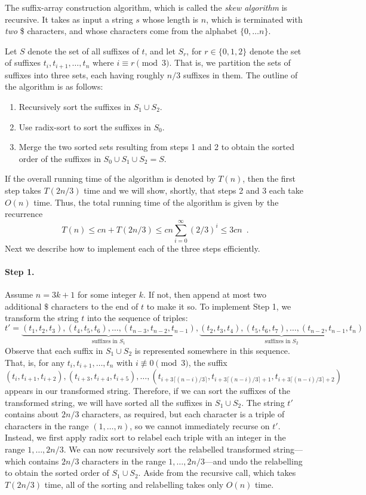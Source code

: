 The suffix-array construction algorithm, which is called the \emph{skew
algorithm} is recursive.  It takes as input a string $s$ whose length
is $n$, which is terminated with \emph{two} \$ characters, and whose
characters come from the alphabet $\{0,\ldots n\}$.

Let $S$ denote the set of all suffixes of $t$, and let $S_r$, for $r\in\{0,1,2\}$ denote the set of suffixes $t_i,t_{i+1},\ldots,t_n$ where $i\equiv r\pmod 3$.  That is, we partition the sets of suffixes into three sets, each having roughly $n/3$ suffixes in them.  The outline of the algorithm is as follows:

\begin{enumerate}
  \item Recursively sort the suffixes in $S_1\cup S_2$.
  \item Use radix-sort to sort the suffixes in $S_0$.
  \item Merge the two sorted sets resulting from steps 1 and 2 to obtain
     the sorted order of the suffixes in $S_0\cup S_1\cup S_2=S$.
\end{enumerate}
If the overall running time of the algorithm is denoted by $T(n)$, then the first step takes $T(2n/3)$ time and we will show, shortly, that steps 2 and 3 each take $O(n)$ time.  Thus, the total running time of the algorithm is given by the recurrence
\[
    T(n) \le cn + T(2n/3) \le cn\sum_{i=0}^\infty (2/3)^i \le 3cn \enspace .
\]
Next we describe how to implement each of the three steps efficiently.

\paragraph{Step 1.}
Assume $n=3k+1$ for some integer $k$. If not, then append at most two additional $\$$ characters to the end of $t$ to make it so.
To implement Step 1, we transform the string $t$ into the sequence of triples:
\[
   t'= \underbrace{(t_1,t_2,t_3),(t_4,t_5,t_6),\ldots,(t_{n-3},t_{n-2},t_{n-1})}_\text{suffixes in $S_1$},
   \underbrace{(t_2,t_3,t_4),(t_5,t_6,t_7),\ldots,(t_{n-2},t_{n-1},t_{n})}_\text{suffixes in $S_2$}
\]
Observe that each suffix in $S_1\cup S_2$ is represented somewhere in this sequence.  That, is, for any $t_i,t_{i+1},\ldots,t_n$ with $i\not\equiv 0\pmod 3$, the suffix 
\[
   (t_i,t_{i+1},t_{i+2}),(t_{i+3},t_{i+4},t_{i+5}),\ldots,
       (t_{i+3\lceil(n-i)/3\rceil},t_{i+3\lceil(n-i)/3\rceil+1},
       t_{i+3\lceil(n-i)/3\rceil+2})
\]
appears in our transformed string. Therefore, if we can sort the suffixes
of the transformed string, we will have sorted all the suffixes in
$S_1\cup S_2$.  The string $t'$ contains about $2n/3$ characters, as
required, but each character is a triple of characters in the range
$(1,\ldots,n)$, so we cannot immediately recurse on $t'$.  Instead,
we first apply radix sort to relabel each triple with an integer in
the range $1,\ldots,2n/3$.  We can now recursively sort the relabelled
transformed string---which contains $2n/3$ characters in the range
$1,\ldots,2n/3$---and undo the relabelling to obtain the sorted order
of $S_1\cup S_2$.
Aside from the recursive call, which takes $T(2n/3)$ time, all of the sorting and relabelling takes only $O(n)$ time.

